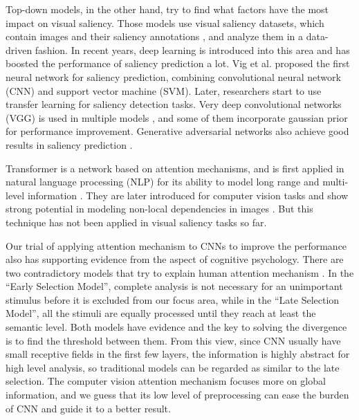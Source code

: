 \documentclass[12pt]{article}
\begin{document}
Top-down models, in the other hand, try to find what factors have the most impact on visual saliency. Those models use visual saliency datasets, which contain images and their saliency annotations
, and analyze them in a data-driven fashion.
In recent years, deep learning is introduced into this area and has boosted the performance of saliency prediction a lot.
Vig et al. \cite{vigLargeScaleOptimizationHierarchical2014} proposed the first neural network for saliency prediction, combining convolutional neural network (CNN) and support vector machine (SVM). Later, researchers start to use transfer learning for saliency
detection tasks. Very deep convolutional networks (VGG) is used in multiple models \cite{kruthiventiDeepFixFullyConvolutional2015, kummererDeepGazeIIReading2016, corniaPredictingHumanEye2018}, and some of them incorporate gaussian prior for performance improvement.
Generative adversarial networks also achieve good results in saliency prediction \cite{panSalGANVisualSaliency2018, cheHowGazeInfluenced2020}.

Transformer is a network based on attention mechanisms, and is first applied in natural language processing (NLP) for its ability to model long range and multi-level information \cite{bahdanauNeuralMachineTranslation2016a, vaswaniAttentionAllYou2017a}.
They are later introduced for computer vision tasks and show strong potential in modeling non-local dependencies in images \cite{zhangSelfAttentionGenerativeAdversarial2019a}.
But this technique has not been applied in visual saliency tasks so far.

Our trial of applying attention mechanism to CNNs to improve the performance also has supporting evidence from the aspect of cognitive psychology. There are two contradictory models that try to explain human attention mechanism \cite{gazzaniga2006cognitive}.
In the “Early Selection Model”, complete analysis is not necessary for an unimportant stimulus before it is excluded from our focus area, while in the “Late Selection Model”, all the stimuli are equally processed until they reach at least the semantic level.
Both models have evidence and the key to solving the divergence is to find the threshold between them. From this view, since CNN usually have small receptive fields in the first few layers, the information is highly abstract for high level analysis, so traditional models can be regarded as similar to the late selection.
The computer vision attention mechanism focuses more on global information, and we guess that its low level of preprocessing can ease the burden of CNN and guide it to a better result.
\end{document}
